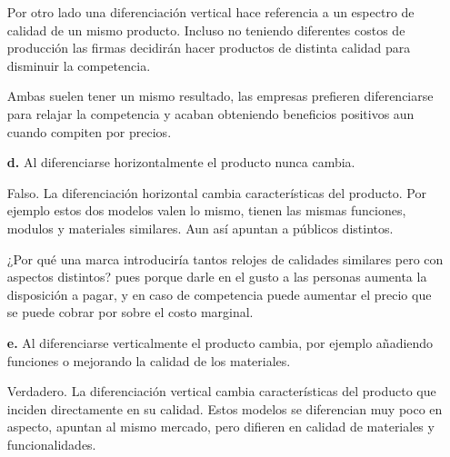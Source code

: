 \documentclass{exam}
\begin{document}
\begin{itemize}
\begin{solution}
        Por otro lado una diferenciación vertical hace referencia a un espectro de calidad de un mismo producto. Incluso no teniendo diferentes costos de producción las firmas decidirán hacer productos de distinta calidad para disminuir la competencia.

        Ambas suelen tener un mismo resultado, las empresas prefieren diferenciarse para relajar la competencia y acaban obteniendo beneficios positivos aun cuando compiten por precios.
    \end{solution}
    \item[\textbf{d.}] Al diferenciarse horizontalmente el producto nunca cambia. 
    \begin{solution}
        Falso. La diferenciación horizontal cambia características del producto. Por ejemplo estos dos modelos valen lo mismo, tienen las mismas funciones, modulos y materiales similares. Aun así apuntan a públicos distintos.
        \begin{center}
        \end{center}
        ¿Por qué una marca introduciría tantos relojes de calidades similares pero con aspectos distintos? pues porque darle en el gusto a las personas aumenta la disposición a pagar, y en caso de competencia puede aumentar el precio que se puede cobrar por sobre el costo marginal.
        
    \end{solution}

    \item[\textbf{e.}] Al diferenciarse verticalmente el producto cambia, por ejemplo añadiendo funciones o mejorando la calidad de los materiales. 
    \begin{solution}
        Verdadero. La diferenciación vertical cambia características del producto que inciden directamente en su calidad. Estos modelos se diferencian muy poco en aspecto, apuntan al mismo mercado, pero difieren en calidad de materiales y funcionalidades.
        \begin{center}
\end{center}
\end{solution}
\end{itemize}
\end{document}
